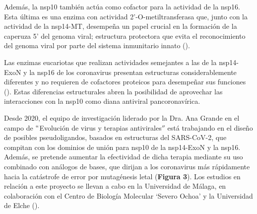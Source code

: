 Además, la nsp10 también actúa como cofactor para la actividad de la nsp16. 
Esta última es una enzima con actividad 2'-O-metiltransferasa que, junto con
la actividad de la nsp14-MT, desempeña un papel crucial en la formación de 
la caperuza 5' del genoma viral; estructura protectora que evita el 
reconocimiento del genoma viral por parte del sistema inmunitario innato 
(\cite{pan_n7-methylation_2022}).

Las enzimas eucariotas que realizan actividades semejantes a las de la 
nsp14-ExoN y la nsp16 de los coronavirus presentan estructuras 
considerablemente diferentes y no requieren de cofactores proteicos para 
desempeñar sus funciones (\cite{galloway_mrna_2019,rona_nsp14nsp10_2022}).
Estas diferencias estructurales abren la posibilidad de aprovechar las 
interacciones con la nsp10 como diana antiviral pancoronavírica.

Desde 2020, el equipo de investigación liderado por la Dra. Ana Grande en el
campo de $``$Evolución de virus y terapias antivirales$''$ está trabajando en 
el diseño de posibles pseudoligandos, basados en estructuras del SARS-CoV-2, 
que compitan con los dominios de unión para nsp10 de la nsp14-ExoN y la 
nsp16. Además, se pretende aumentar la efectividad de dicha terapia mediante
su uso combinado con análogos de bases, que dirijan a los coronavirus más 
rápidamente hacia la catástrofe de error por mutagénesis letal 
(\textbf{Figura 3}). Los estudios en relación a este proyecto se llevan a 
cabo en la Universidad de Málaga, en colaboración con el Centro de Biología 
Molecular `Severo Ochoa' y la Universidad de Elche (\cite{grande-perez_nueva_2021}).

